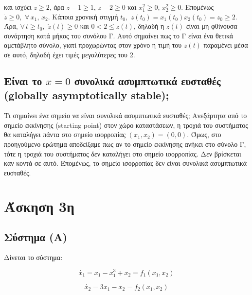 \documentclass{article}
\begin{document}
\hfill\break
και ισχύει \(z \geq 2\), άρα \(z - 1 \geq 1\), \(z - 2 \geq 0\) και \(x_1^2 \geq 0\), \(x_2^2 \geq 0\). Επομένως \(\dot{z} \geq 0,\,\,\forall\,x_1,\,x_2\). Κάποια χρονική στιγμή \(t_0,\,\,z(t_0) = x_1(t_0) x_2(t_0) = z_0 \geq 2\). Άρα, \(\forall\,t \geq t_0,\,\,\dot{z}(t) \geq 0\) και \(0 < 2 \leq z(t)\), δηλαδή η \(z(t)\) είναι μη φθίνουσα συνάρτηση κατά μήκος του συνόλου Γ. Αυτό σημαίνει πως το Γ είναι ένα θετικά αμετάβλητο σύνολο, γιατί προχωρώντας στον χρόνο η τιμή του \(z(t)\) παραμένει μέσα σε αυτό, δηλαδή έχει τιμές μεγαλύτερες του 2.

\subsection{Είναι το \(x = 0\) συνολικά ασυμπτωτικά ευσταθές (globally asymptotically stable);}
Τι σημαίνει ένα σημείο να είναι συνολικά ασυμπτωτικά ευσταθές; Ανεξάρτητα από το σημείο εκκίνησης (starting point) στον χώρο καταστάσεων, η τροχιά του συστήματος θα καταλήγει πάντα στο σημείο ισορροπίας \((x_1, x_2) = (0, 0)\). Όμως, στο προηγούμενο ερώτημα αποδείξαμε πως αν το σημείο εκκίνησης ανήκει στο σύνολο Γ, τότε η τροχιά του συστήματος δεν καταλήγει στο σημείο ισορροπίας. Δεν βρίσκεται καν κοντά σε αυτό. Επομένως, το σημείο ισορροπίας δεν είναι συνολικά ασυμπτωτικά ευσταθές.

\section{Άσκηση 3η}
\subsection{Σύστημα (Α)}
Δίνεται το σύστημα:

\begin{equation*}
    \dot{x_1} = x_1 - x_1^3 + x_2 = f_1(x_1, x_2)
\end{equation*}

\begin{equation*}
    \dot{x_2} = 3x_1 - x_2 = f_2(x_1, x_2)
\end{equation*}
\end{document}
